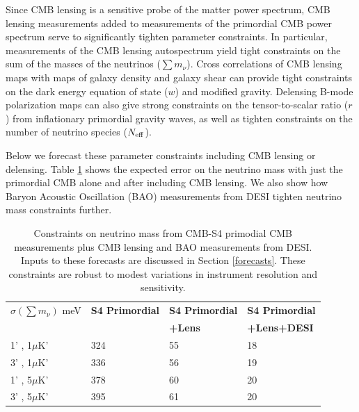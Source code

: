 Since CMB lensing is a sensitive probe of the matter power spectrum, CMB lensing measurements added to measurements of the primordial CMB power spectrum serve to significantly tighten parameter constraints.  In particular, measurements of the CMB lensing autospectrum yield tight constraints on the sum of the masses of the neutrinos ($\sum {m_\nu}$).  Cross correlations of CMB lensing maps with maps of galaxy density and galaxy shear can provide tight constraints on the dark energy equation of state ($w$) and modified gravity.  Delensing B-mode polarization maps can also give strong constraints on the tensor-to-scalar ratio ($r$) from inflationary primordial gravity waves, as well as tighten constraints on the number of neutrino species ($N_{\rm{eff}}$).  

Below we forecast these parameter constraints including CMB lensing or delensing.  Table \ref{neutrinoTable} shows the expected error on the neutrino mass with just the primordial CMB alone and after including CMB lensing. We also show how Baryon Acoustic Oscillation (BAO) measurements from DESI tighten neutrino mass constraints further.  

\begin{table}[h]
\centering
\caption{Constraints on neutrino mass from CMB-S4 primodial CMB measurements plus CMB lensing and BAO measurements from DESI.  Inputs to these forecasts are discussed in Section \ref{forecasts}.  These constraints are robust to modest variations in instrument resolution and sensitivity.\vspace{0.2cm}}
\label{neutrinoTable}
\begin{tabular}{|l|l|l|l|}
\hline
$\sigma(\sum m_{\nu})$ meV & \textbf{S4 Primordial} & \textbf{S4 Primordial} & \textbf{S4 Primordial} \\
&                         &  \textbf{+Lens} & \textbf{+Lens+DESI} \\ \hline
1' , 1$\mu$K'              & 324         & 55               & 18                    \\ \hline
3' , 1$\mu$K'              & 336         & 56               & 19                    \\ \hline
1' , 5$\mu$K'              & 378         & 60               & 20                    \\ \hline
3' , 5$\mu$K'              & 395         & 61               & 20                    \\ \hline
\end{tabular}
\end{table}


